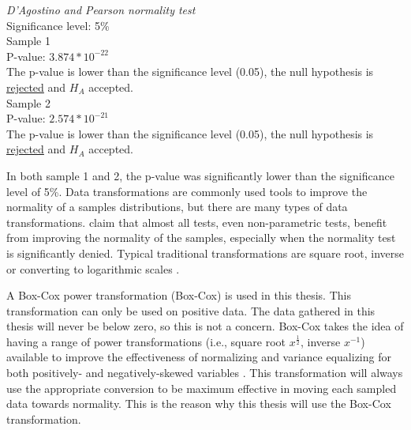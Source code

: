 \begin{center}
	\begin{tcolorbox}[width=0.80\textwidth]
		\centering
				\textit{D'Agostino and Pearson normality test}\\
				Significance level: 5\%  \\[0.5cm]
	
				Sample 1\\
				P-value: $3.874 * 10^{-22}$\\
				The p-value is lower than the significance level (0.05), the null hypothesis is \underline{rejected} and $H_A$ accepted.\\[0.5cm]
				
				Sample 2\\
				P-value: $2.574 * 10^{-21}$ \\
				The p-value is lower than the significance level (0.05), the null hypothesis is \underline{rejected} and $H_A$ accepted.\\[0.5cm]
	\end{tcolorbox} 
\end{center}
In both sample 1 and 2, the p-value was significantly lower than the significance level of 5\%. Data transformations are commonly used tools to improve the normality of a samples distributions, but there are many types of data transformations. \cite{Osborne2010} claim that almost all tests, even non-parametric tests, benefit from improving the normality of the samples, especially when the normality test is significantly denied. Typical traditional transformations are square root, inverse or converting to logarithmic scales  \citep{Osborne2010}. 

A Box-Cox power transformation (Box-Cox) is used in this thesis. This transformation can only be used on positive data. The data gathered in this thesis will never be below zero, so this is not a concern. Box-Cox takes the idea of having a range of power transformations (i.e., square root $x^{\frac{1}{2}}$, inverse $x^{-1}$) available to improve the effectiveness of normalizing and variance equalizing for both positively- and negatively-skewed variables \citep{Osborne2010}. This transformation will always use the appropriate conversion to be maximum effective in moving each sampled data towards normality. This is the reason why this thesis will use the Box-Cox transformation.

